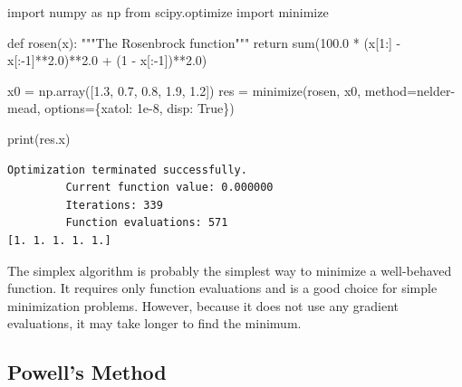 \documentclass[
  letterpaper,
  DIV=11,
  numbers=noendperiod]{scrreprt}
\newenvironment{Shaded}{\begin{snugshade}}{\end{snugshade}}
\newcommand{\BuiltInTok}[1]{\textcolor[rgb]{0.00,0.23,0.31}{#1}}
\newcommand{\CommentTok}[1]{\textcolor[rgb]{0.37,0.37,0.37}{#1}}
\newcommand{\ControlFlowTok}[1]{\textcolor[rgb]{0.00,0.23,0.31}{#1}}
\newcommand{\DecValTok}[1]{\textcolor[rgb]{0.68,0.00,0.00}{#1}}
\newcommand{\FloatTok}[1]{\textcolor[rgb]{0.68,0.00,0.00}{#1}}
\newcommand{\ImportTok}[1]{\textcolor[rgb]{0.00,0.46,0.62}{#1}}
\newcommand{\KeywordTok}[1]{\textcolor[rgb]{0.00,0.23,0.31}{#1}}
\newcommand{\NormalTok}[1]{\textcolor[rgb]{0.00,0.23,0.31}{#1}}
\newcommand{\OperatorTok}[1]{\textcolor[rgb]{0.37,0.37,0.37}{#1}}
\newcommand{\StringTok}[1]{\textcolor[rgb]{0.13,0.47,0.30}{#1}}
\newcommand{\VariableTok}[1]{\textcolor[rgb]{0.07,0.07,0.07}{#1}}
\begin{document}
\begin{Shaded}
\begin{Highlighting}[]
\ImportTok{import}\NormalTok{ numpy }\ImportTok{as}\NormalTok{ np}
\ImportTok{from}\NormalTok{ scipy.optimize }\ImportTok{import}\NormalTok{ minimize}

\KeywordTok{def}\NormalTok{ rosen(x):}
    \CommentTok{"""The Rosenbrock function"""}
    \ControlFlowTok{return} \BuiltInTok{sum}\NormalTok{(}\FloatTok{100.0} \OperatorTok{*}\NormalTok{ (x[}\DecValTok{1}\NormalTok{:] }\OperatorTok{{-}}\NormalTok{ x[:}\OperatorTok{{-}}\DecValTok{1}\NormalTok{]}\OperatorTok{**}\FloatTok{2.0}\NormalTok{)}\OperatorTok{**}\FloatTok{2.0} \OperatorTok{+}\NormalTok{ (}\DecValTok{1} \OperatorTok{{-}}\NormalTok{ x[:}\OperatorTok{{-}}\DecValTok{1}\NormalTok{])}\OperatorTok{**}\FloatTok{2.0}\NormalTok{)}

\NormalTok{x0 }\OperatorTok{=}\NormalTok{ np.array([}\FloatTok{1.3}\NormalTok{, }\FloatTok{0.7}\NormalTok{, }\FloatTok{0.8}\NormalTok{, }\FloatTok{1.9}\NormalTok{, }\FloatTok{1.2}\NormalTok{])}
\NormalTok{res }\OperatorTok{=}\NormalTok{ minimize(rosen, x0, method}\OperatorTok{=}\StringTok{\textquotesingle{}nelder{-}mead\textquotesingle{}}\NormalTok{,}
\NormalTok{               options}\OperatorTok{=}\NormalTok{\{}\StringTok{\textquotesingle{}xatol\textquotesingle{}}\NormalTok{: }\FloatTok{1e{-}8}\NormalTok{, }\StringTok{\textquotesingle{}disp\textquotesingle{}}\NormalTok{: }\VariableTok{True}\NormalTok{\})}

\BuiltInTok{print}\NormalTok{(res.x)}
\end{Highlighting}
\end{Shaded}

\begin{verbatim}
Optimization terminated successfully.
         Current function value: 0.000000
         Iterations: 339
         Function evaluations: 571
[1. 1. 1. 1. 1.]
\end{verbatim}

The simplex algorithm is probably the simplest way to minimize a
well-behaved function. It requires only function evaluations and is a
good choice for simple minimization problems. However, because it does
not use any gradient evaluations, it may take longer to find the
minimum.

\subsection{Powell's Method}\label{sec-powells-method}
\end{document}
